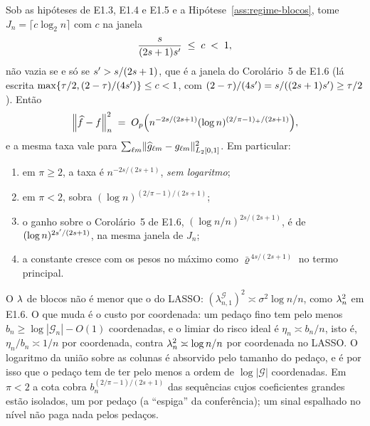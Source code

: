 \documentclass[11pt,a4paper]{article}
\newcommand{\Gcal}{\mathcal{G}}
\newcommand{\bn}{b_{n}}
\newcommand{\lamGone}{\lambda^{\mathcal{G}}_{n,1}}
\begin{document}
\begin{corollary}\label{cor:adaptativa-blocos}
Sob as hipóteses de E1.3, E1.4 e E1.5 e a Hipótese~\ref{ass:regime-blocos},
tome $J_{n} = \lceil c\log_{2}n\rceil$ com $c$ na janela
\begin{equation}
  \label{eq:janela-blocos}
  \frac{s}{(2s+1)s'} \;\le\; c \;<\; 1,
\end{equation}
não vazia se e só se $s' > s/(2s+1)$, que é a janela do Corolário~5 de
E1.6 (lá escrita $\max\{\tau/2,(2-\tau)/(4s')\} \le c < 1$, com
$(2-\tau)/(4s') = s/((2s+1)s') \ge \tau/2$). Então
\[
  \left\lVert \widehat f - f \right\rVert_{n}^{2}
  \;=\; O_{p}\Bigl(n^{-2s/(2s+1)}(\log n)^{(2/\pi-1)_{+}/(2s+1)}\Bigr),
\]
e a mesma taxa vale para $\sum_{\ell m}\lVert\widehat g_{\ell m} -
g_{\ell m}\rVert_{L_{2}[0,1]}^{2}$. Em particular:
\begin{enumerate}[label=\textup{(\roman*)}, leftmargin=*, nosep]
  \item em $\pi \ge 2$, a taxa é $n^{-2s/(2s+1)}$, \emph{sem logaritmo};
  \item em $\pi < 2$, sobra $(\log n)^{(2/\pi-1)/(2s+1)}$;
  \item o ganho sobre o Corolário~5 de E1.6, $(\log n/n)^{2s/(2s+1)}$, é de
    $(\log n)^{2s'/(2s+1)}$, na mesma janela de $J_{n}$;
  \item a constante cresce com os pesos no máximo como
    $\bar\varrho^{\,4s/(2s+1)}$ no termo principal.
\end{enumerate}
\end{corollary}

\begin{remark}\label{rem:logaritmo}
O $\lambda$ de blocos não é menor que o do LASSO: $(\lamGone)^{2} \asymp
\sigma^{2}\log n/n$, como $\lambda_{n}^{2}$ em E1.6. O que muda é o custo por
coordenada: um pedaço fino tem pelo menos $\bn \ge \log|\Gcal_{n}| - O(1)$
coordenadas, e o limiar do risco ideal é $\eta_{n} \asymp \bn/n$, isto é,
$\eta_{n}/\bn \asymp 1/n$ por coordenada, contra $\lambda_{n}^{2} \asymp \log n/n$
por coordenada no LASSO. O logaritmo da união sobre as colunas é absorvido
pelo tamanho do pedaço, e é por isso que o pedaço tem de ter pelo menos a
ordem de $\log|\Gcal|$ coordenadas. Em $\pi < 2$ a cota cobra
$\bn^{(2/\pi-1)/(2s+1)}$ das sequências cujos coeficientes grandes estão
isolados, um por pedaço (a ``espiga'' da conferência); um sinal espalhado no
nível não paga nada pelos pedaços.
\end{remark}
\end{document}
